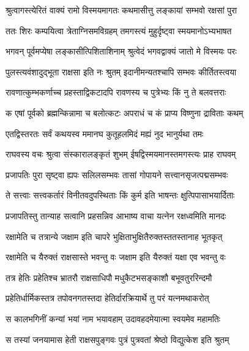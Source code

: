 
\twolineshloka
{श्रुत्वागस्त्येरितं वाक्यं रामो विस्मयमागतः}
{कथमासीत्तु लङ्कायां सम्भवो रक्षसां पुरा} %

\twolineshloka
{ततः शिरः कम्पयित्वा त्रेताग्निसमविग्रहम्}
{तमगस्त्यं मुहुर्दृष्ट्वा स्मयमानोऽभ्यभाषत} %

\twolineshloka
{भगवन् पूर्वमप्येषा लङ्कासीत्पिशिताशिनाम्}
{श्रुत्वेदं भगवद्वाक्यं जातो मे विस्मयः परः} %

\twolineshloka
{पुलस्त्यवंशादुद्भूता राक्षसा इति नः श्रुतम्}
{इदानीमन्यतश्चापि सम्भवः कीर्तितस्त्वया} %

\twolineshloka
{रावणात्कुम्भकर्णाच्च प्रहस्ताद्विकटादपि}
{रावणस्य च पुत्रेभ्यः किं नु ते बलवत्तराः} %

\twolineshloka
{क एषां पूर्वको ब्रह्मन्किन्नामा च बलोत्कटः}
{अपराधं च कं प्राप्य विष्णुना द्राविताः कथम्} %

\twolineshloka
{एतद्विस्तरतः सर्वं कथयस्व ममानघ}
{कुतूहलमिदं मह्यं नुद भानुर्यथा तमः} %

\twolineshloka
{राघवस्य वचः श्रुत्वा संस्कारालङ्कृतं शुभम्}
{ईषद्विस्मयमानस्तमगस्त्यः प्राह राघवम्} %

\twolineshloka
{प्रजापतिः पुरा सृष्ट्वा ह्यपः सलिलसम्भवः}
{तासां गोपायने सत्त्वानसृजत्पद्मसम्भवः} %

\twolineshloka
{ते सत्त्वाः सत्त्वकर्तारं विनीतवदुपस्थिताः}
{किं कुर्म इति भाषन्तः क्षुत्पिपासाभयार्दिताः} %

\twolineshloka
{प्रजापतिस्तु तान्याह सत्वानि प्रहसन्निव}
{आभाष्य वाचा यत्नेन रक्षध्वमिति मानदः} %

\twolineshloka
{रक्षामेति च तत्रान्ये जक्षाम इति चापरे}
{भुक्षिताभुक्षितैरुक्तस्ततस्तानाह भूतकृत्} %

\twolineshloka
{रक्षामेति च यैरुक्तं राक्षसास्ते भवन्तु वः}
{जक्षाम इति यैरुक्तं यक्षा एव भवन्तु वः} %

\twolineshloka
{तत्र हेतिः प्रहेतिश्च भ्रातरौ राक्षसाधिपौ}
{मधुकैटभसङ्काशौ बभूवतुररिन्दमौ} %

\twolineshloka
{प्रहेतिर्धार्मिकस्तत्र तपोवनगतस्तदा}
{हेतिर्दारक्रियार्थे तु परं यत्नमथाकरोत्} %

\twolineshloka
{स कालभगिनीं कन्यां भयां नाम भयावहाम्}
{उदावहदमेयात्मा स्वयमेव महामतिः} %

\twolineshloka
{स तस्यां जनयामास हेती राक्षसपुङ्गवः}
{पुत्रं पुत्रवतां श्रेष्ठो विद्युत्केश इति श्रुतम्} %

